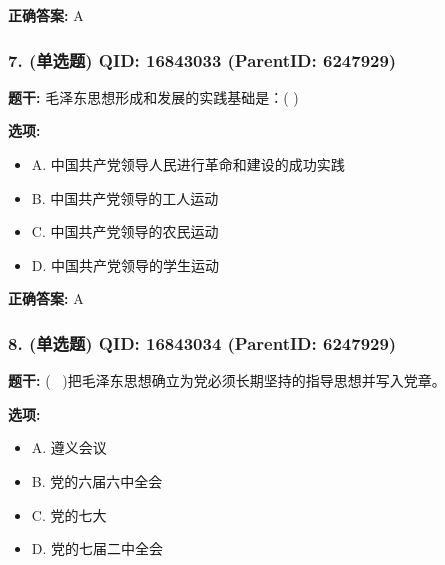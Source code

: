 \documentclass[12pt,UTF8]{ctexart}
\begin{document}
\textbf{正确答案:}
A

\vspace{0.3em}\hrulefill\vspace{0.7em}

\subsubsection*{7. (单选题) \small QID: 16843033 (ParentID: 6247929)}

\textbf{题干:}
毛泽东思想形成和发展的实践基础是：( )



\textbf{选项:}
\begin{itemize}[leftmargin=*]

  \item A. 中国共产党领导人民进行革命和建设的成功实践

  \item B. 中国共产党领导的工人运动

  \item C. 中国共产党领导的农民运动

  \item D. 中国共产党领导的学生运动

\end{itemize}

\textbf{正确答案:}
A

\vspace{0.3em}\hrulefill\vspace{0.7em}

\subsubsection*{8. (单选题) \small QID: 16843034 (ParentID: 6247929)}

\textbf{题干:}
(  )把毛泽东思想确立为党必须长期坚持的指导思想并写入党章。



\textbf{选项:}
\begin{itemize}[leftmargin=*]

  \item A. 遵义会议

  \item B. 党的六届六中全会

  \item C. 党的七大

  \item D. 党的七届二中全会

\end{itemize}
\end{document}
